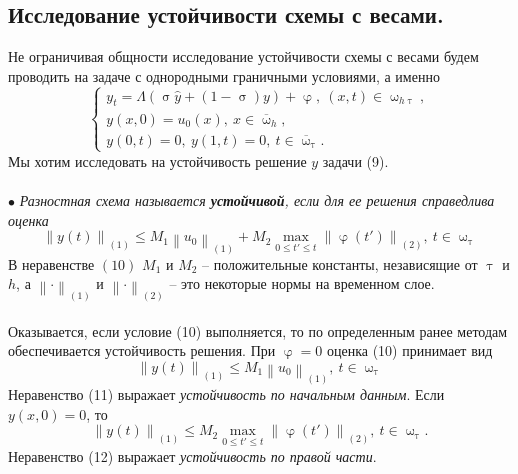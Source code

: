 \documentclass[a4paper, 12pt]{report}
\numberwithin{equation}{section}
\newcommand{\ol}{\overline}
\renewcommand{\leq}{\leqslant}
\renewcommand{\varphi}{\upvarphi}
\renewcommand{\tau}{\uptau}
\renewcommand{\sigma}{\upsigma}
\renewcommand{\omega}{\upomega}
\newcommand\Norm[1]{\left\| #1 \right\|}
\begin{document}
		\subsection{Исследование устойчивости схемы с весами.}
		Не ограничивая общности исследование устойчивости схемы с весами будем проводить на задаче с однородными граничными условиями, а именно
		\begin{equation}
			\begin{cases}
				y_t = \Lambda(\sigma \hat y + (1-\sigma)y)+\varphi,\ (x,t)\in \omega_{h\tau},\\
				y(x,0) = u_0(x),\ x \in \ol \omega_h,\\
				y(0, t) = 0,\ y(1,t) = 0,\ t \in \ol \omega_\tau.
			\end{cases}
		\end{equation}
		Мы хотим исследовать на устойчивость решение $y$ задачи (9). \\\\
		$\bullet$ \textit{Разностная схема называется \textbf{устойчивой}, если для ее решения справедлива оценка}
		\begin{equation}
			\Norm{y(t)}_{(1)}\leq M_1 \Norm{u_0}_{(1)} + M_2 \underset{0 \leq t' \leq t}{\max}\Norm{\varphi(t')}_{(2)},\ t \in \omega_\tau
		\end{equation}
		В неравенстве $(10)$ $M_1$ и $M_2$ -- положительные константы, независящие от $\tau$ и $h$, а $\Norm{\cdot}_{(1)}$ и $\Norm{\cdot}_{(2)}$ -- это некоторые нормы на временном слое. \\\\
		Оказывается, если условие (10) выполняется, то по определенным ранее методам обеспечивается устойчивость решения. При $\varphi = 0$ оценка (10) принимает вид
		\begin{equation}
			\Norm{y(t)}_{(1)}\leq M_1 \Norm{u_0}_{(1)},\ t \in \omega_\tau
		\end{equation}
		Неравенство (11) выражает \textit{устойчивость по начальным данным}. Если $y(x,0) = 0$, то \begin{equation}
			\Norm{y(t)}_{(1)}\leq M_2 \underset{0 \leq t' \leq t}{\max}\Norm{\varphi(t')}_{(2)},\ t \in \omega_\tau.
		\end{equation}
		Неравенство (12) выражает \textit{устойчивость по правой части}.
		
\end{document}
